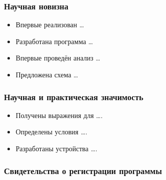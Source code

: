 \begin{frame}
    \frametitle{Научная новизна}
    \begin{itemize}
        \item Впервые реализован \dots
        \item Разработана программа \dots
        \item Впервые проведён анализ \dots
        \item Предложена схема \dots
    \end{itemize}
\end{frame}


\begin{frame}
    \frametitle{Научная и практическая значимость}
    \begin{itemize}
        \item Получены выражения для \dots.
        \item Определены условия \dots.
        \item Разработаны устройства \dots.
    \end{itemize}
\end{frame}


\begin{frame}
    \frametitle{Свидетельства о регистрации программы}
    \begin{minipage}[t]{0.3\linewidth}
    \end{minipage}
    \hfill
    \begin{minipage}[t]{0.3\linewidth}
    \end{minipage}
    \hfill
    \begin{minipage}[t]{0.3\linewidth}
    \end{minipage}
\end{frame}


